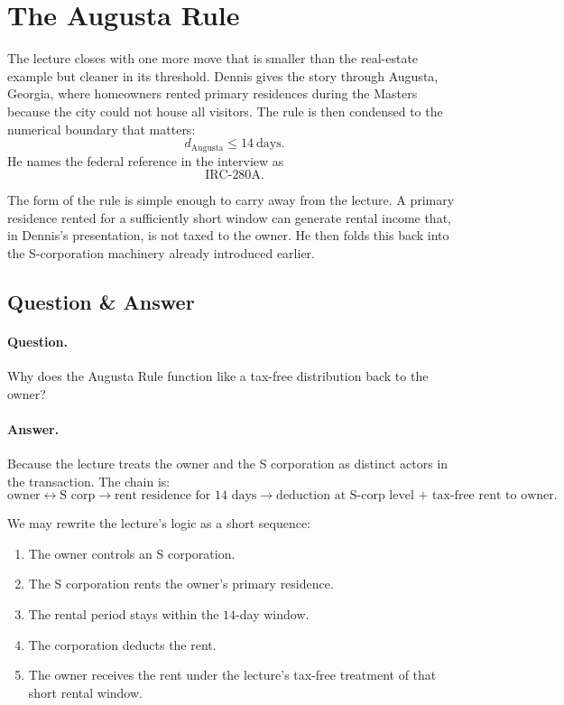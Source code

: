 \section{The Augusta Rule}

The lecture closes with one more move that is smaller than the real-estate example but cleaner in its threshold. Dennis gives the story through Augusta, Georgia, where homeowners rented primary residences during the Masters because the city could not house all visitors. The rule is then condensed to the numerical boundary that matters:
\begin{equation}
d_{\mathrm{Augusta}} \le 14\ \text{days}.
\end{equation}
He names the federal reference in the interview as
\begin{equation}
\mathrm{IRC}\text{-}280\mathrm{A}.
\end{equation}

The form of the rule is simple enough to carry away from the lecture. A primary residence rented for a sufficiently short window can generate rental income that, in Dennis's presentation, is not taxed to the owner. He then folds this back into the S-corporation machinery already introduced earlier.

\subsection{Question \& Answer}

\paragraph{Question.} Why does the Augusta Rule function like a tax-free distribution back to the owner?

\paragraph{Answer.} Because the lecture treats the owner and the S corporation as distinct actors in the transaction. The chain is:
\begin{equation}
\text{owner} \leftrightarrow \text{S corp}
\to
\text{rent residence for }14\text{ days}
\to
\text{deduction at S-corp level + tax-free rent to owner}.
\end{equation}

We may rewrite the lecture's logic as a short sequence:
\begin{enumerate}
\item The owner controls an S corporation.
\item The S corporation rents the owner's primary residence.
\item The rental period stays within the \(14\)-day window.
\item The corporation deducts the rent.
\item The owner receives the rent under the lecture's tax-free treatment of that short rental window.
\end{enumerate}


